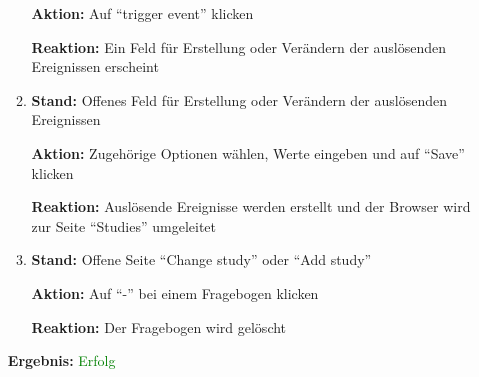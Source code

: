\documentclass[a4paper]{scrreprt}
\begin{document}
\begin{itemize}
\begin{enumerate}
		                                    \par \textbf{Aktion: }Auf ``trigger event'' klicken
		                                    \par \textbf{Reaktion: }Ein Feld f\"ur Erstellung oder Ver\"andern der ausl\"osenden Ereignissen erscheint
		                              \item \par \textbf{Stand: }Offenes Feld f\"ur Erstellung oder Ver\"andern der ausl\"osenden Ereignissen
		                                    \par \textbf{Aktion: }Zugeh\"orige Optionen w\"ahlen, Werte eingeben und auf ``Save'' klicken
		                                    \par \textbf{Reaktion: }Ausl\"osende Ereignisse werden erstellt und der Browser wird zur Seite ``Studies'' umgeleitet
		                              \item \par \textbf{Stand: }Offene Seite ``Change study'' oder ``Add study''
		                                    \par \textbf{Aktion: }Auf ``-'' bei einem Fragebogen klicken
		                                    \par \textbf{Reaktion: }Der Fragebogen wird gel\"oscht
		                          \end{enumerate}
		      					\vspace*{0.3cm}
		      		           \par \textbf{Ergebnis: }\textcolor{green}{Erfolg}
		      		           \vspace*{0.6cm}
		

\end{itemize}
\end{document}
